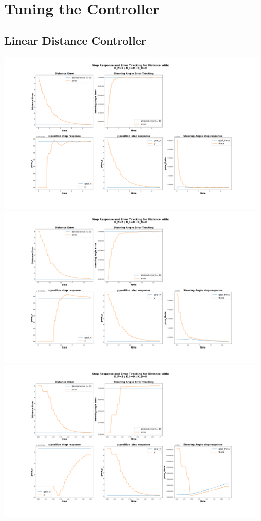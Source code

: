 \documentclass[a4paper,12pt]{article}
\begin{document}
	\section{Tuning the Controller}
	\label{appendix:Controller-tuning}
	\subsection{Linear Distance Controller}
	\includegraphics[scale=0.25]{images/control_dist_1_0_0.png}\\
	\includegraphics[scale=0.25]{images/control_dist_2_0_0.png}
	\\
	\includegraphics[scale=0.25]{images/control_dist_3_0_0.png}\\
\end{document}
